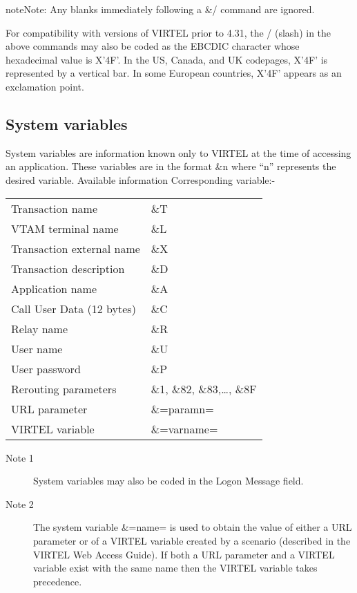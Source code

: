 \documentclass[letterpaper,10pt,english]{sphinxmanual}
\begin{document}
\begin{sphinxadmonition}{note}{Note:}
Any blanks immediately following a \&/ command are ignored.
\end{sphinxadmonition}

For compatibility with versions of VIRTEL prior to 4.31, the / (slash) in the above commands may also be coded as the EBCDIC character whose hexadecimal value is X’4F’. In the US, Canada, and UK codepages, X’4F’ is represented by a vertical bar. In some European countries, X’4F’ appears as an exclamation point.


\subsection{System variables}
\label{\detokenize{connectivity_guide:system-variables}}
System variables are information known only to VIRTEL at the time of accessing an application. These variables are in the format \&n where “n” represents the desired variable.
Available information Corresponding variable:-


\begin{savenotes}\sphinxattablestart
\centering
\begin{tabulary}{\linewidth}[t]{|T|T|}
\hline
{}\relax &\relax \\
\hline
Transaction name
&
\&T
\\
\hline
VTAM terminal name
&
\&L
\\
\hline
Transaction external name
&
\&X
\\
\hline
Transaction description
&
\&D
\\
\hline
Application name
&
\&A
\\
\hline
Call User Data (12 bytes)
&
\&C
\\
\hline
Relay name
&
\&R
\\
\hline
User name
&
\&U
\\
\hline
User password
&
\&P
\\
\hline
Rerouting parameters
&
\&1, \&82, \&83,…, \&8F
\\
\hline
URL parameter
&
\&=paramn=
\\
\hline
VIRTEL variable
&
\&=varname=
\\
\hline
\end{tabulary}
\par
\sphinxattableend\end{savenotes}
\begin{description}
\item[{Note 1}] \leavevmode
System variables may also be coded in the Logon Message field.

\item[{Note 2}] \leavevmode
The system variable \&=name= is used to obtain the value of either a URL parameter or of a VIRTEL variable created by a scenario (described in the VIRTEL Web Access Guide). If both a URL parameter and a VIRTEL variable exist with the same name then the VIRTEL variable takes precedence.

\end{description}
\end{document}
